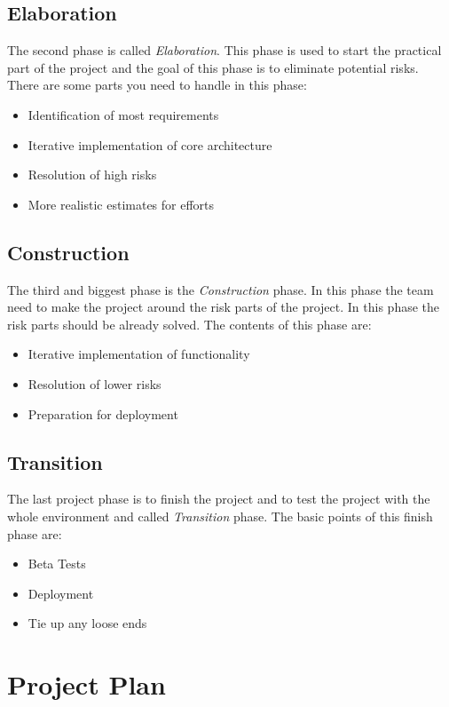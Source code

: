 \subsection{Elaboration}
The second phase is called \textit{Elaboration}. This phase is used to start the practical part of the project and the goal of this phase is to eliminate potential risks. There are some parts you need to handle in this phase:
\begin{itemize}
    \item Identification of most requirements
    \item Iterative implementation of core architecture
    \item Resolution of high risks
    \item More realistic estimates for efforts
\end{itemize}

\subsection{Construction}
The third and biggest phase is the \textit{Construction} phase. In this phase the team need to make the project around the risk parts of the project. In this phase the risk parts should be already solved.
The contents of this phase are:
\begin{itemize}
    \item Iterative implementation of functionality
    \item Resolution of lower risks
    \item Preparation for deployment
\end{itemize}

\subsection{Transition}
The last project phase is to finish the project and to test the project with the whole environment and called \textit{Transition} phase.
The basic points of this finish phase are:
\begin{itemize}
    \item Beta Tests
    \item Deployment
    \item Tie up any loose ends
\end{itemize}

\section{Project Plan}
